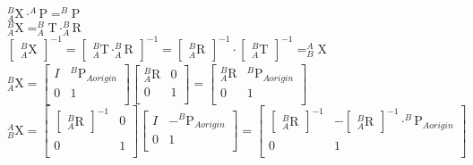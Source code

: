 \documentclass[12pt,fleqn]{standalone}
\begin{document}
\begin{preview}

${\displaystyle _{A}^{B}\textrm{X} \cdot _{}^{A}\textrm{P}= _{}^{B}\textrm{P}}$\\
${\displaystyle _{A}^{B}\textrm{X}=_{A}^{B}\textrm{T} \cdot _{A}^{B}\textrm{R}}$\\
${\displaystyle \begin{bmatrix}_{A}^{B}\textrm{X}\end{bmatrix}_{}^{-1}=\begin{bmatrix}_{A}^{B}\textrm{T} \cdot _{A}^{B}\textrm{R}\end{bmatrix}_{}^{-1}=\begin{bmatrix}_{A}^{B}\textrm{R}\end{bmatrix}_{}^{-1} \cdot \begin{bmatrix}_{A}^{B}\textrm{T}\end{bmatrix}_{}^{-1}=_{B}^{A}\textrm{X}}$\\
${\displaystyle _{A}^{B}\textrm{X} =\begin{bmatrix}
I & _{}^{B}\textrm{P}_{A origin}^{} \\
0 & 1 \\
\end{bmatrix}\begin{bmatrix}
_{A}^{B}\textrm{R} & 0 \\
0 & 1 \\
\end{bmatrix}=\begin{bmatrix}
_{A}^{B}\textrm{R} & _{}^{B}\textrm{P}_{A origin}^{} \\
0 & 1 \\
\end{bmatrix}}$ \\
${\displaystyle _{B}^{A}\textrm{X}=\begin{bmatrix}
\begin{bmatrix}
_{A}^{B}\textrm{R}\end{bmatrix}_{}^{-1} &  0\\
0 & 1 \\
\end{bmatrix}\begin{bmatrix}
I & -_{}^{B}\textrm{P}_{A origin}^{} \\
0 & 1 \\
\end{bmatrix}=\begin{bmatrix}
\begin{bmatrix}
_{A}^{B}\textrm{R}\end{bmatrix}_{}^{-1} & -\begin{bmatrix}
_{A}^{B}\textrm{R}\end{bmatrix}_{}^{-1} \cdot _{}^{B}\textrm{P}_{A origin}^{}\\
0 & 1 \\
\end{bmatrix}}
$
\end{preview}
\end{document}
